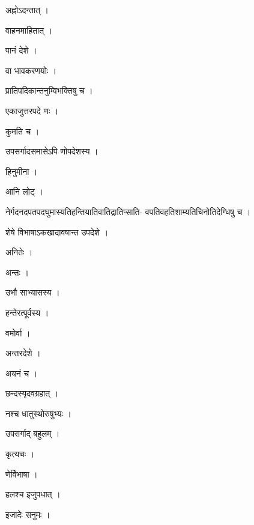 \documentclass[10pt, openany]{book}
\begin{document}
\noindent अह्नोऽदन्तात् ।

\noindent वाहनमाहितात् ।

\noindent पानं देशे ।

\noindent वा भावकरणयोः ।

\noindent प्रातिपदिकान्तनुम्विभक्तिषु च ।

\noindent एकाजुत्तरपदे णः ।

\noindent कुमति च ।

\noindent उपसर्गादसमासेऽपि णोपदेशस्य ।

\noindent हिनुमीना ।

\noindent आनि लोट् ।

\noindent नेर्गदनदपतपदघुमास्यतिहन्तियातिवातिद्रातिप्साति- वपतिवहतिशाम्यतिचिनोतिदेग्धिषु च ।

\noindent शेषे विभाषाऽकखादावषान्त उपदेशे ।

\noindent अनितेः ।

\noindent अन्तः ।

\noindent उभौ साभ्यासस्य ।

\noindent हन्तेरत्पूर्वस्य ।

\noindent वमोर्वा ।

\noindent अन्तरदेशे ।

\noindent अयनं च ।

\noindent छन्दस्यृदवग्रहात् ।

\noindent नश्च धातुस्थोरुषुभ्यः ।

\noindent उपसर्गाद् बहुलम् ।

\noindent कृत्यचः ।

\noindent णेर्विभाषा ।

\noindent हलश्च इजुपधात् ।

\noindent इजादेः सनुमः ।
\end{document}
